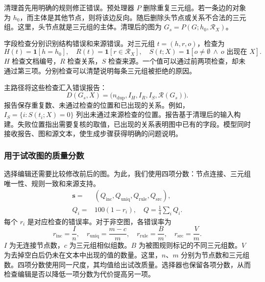 清理首先用明确的规则修正错误。预处理器 $P$ 删除重复三元组。若一条边的对象为 $h_0$，而主体是其他节点，则将该边反向。随后删除头节点或关系不合法的三元组。这里，头节点就是三元组的主体。清理后的图为 $G_s=P(G;h_0,\mathcal R_X)$。

字段检查分别识别结构错误和来源错误。对三元组 $t=(h,r,o)$，检查为
\begin{equation}
    \label{eq:diagnostic_predicates}
    H(t)=\mathbf1[h=h_0],\quad
    R(t)=\mathbf1[r\in\mathcal R_X],\quad
    S(t;X)=\mathbf1[o\ne\emptyset\ \wedge\ o\text{ 出现在 }X].
\end{equation}
$H$ 检查文档编号，$R$ 检查关系，$S$ 检查来源。一个值可以通过前两项检查，却未通过第三项。分别检查可以清楚说明每条三元组被拒绝的原因。

主路径将这些检查汇入错误报告：
\begin{equation}
    \label{eq:diagnostic_context}
    D(G_s,X)=\big(n_{\mathrm{dup}},I_H,I_R,I_S,\mathcal R(G_s)\big).
\end{equation}
报告保存重复数、未通过检查的位置和已出现的关系。例如，$I_S=\{i:S(t_i;X)=0\}$ 列出未通过来源检查的位置。报告基于清理后的输入构建。失败位置指出需要复核的取值，已出现的关系表明图中已有的字段。模型同时接收报告、图和源文本，使生成步骤获得明确的问题说明。

\subsubsection{用于试改图的质量分数}
\label{sec:impl:profile_revision}

选择编辑还需要比较修改前后的图。为此，我们使用四项分数：节点连接、三元组唯一性、规则一致和来源支持。
\begin{equation}
\label{eq:quality_state}
\begin{split}
\mathbf{s}={}&(Q_{\mathrm{inc}},Q_{\mathrm{uniq}},Q_{\mathrm{rule}},Q_{\mathrm{src}}),\\
Q_i={}&100(1-r_i),\quad Q=\tfrac14\sum_i Q_i.
\end{split}
\end{equation}
每个 $r_i$ 是对应检查的错误率。对于非空图，各错误率为
\begin{equation}
\label{eq:profile_rates}
r_{\mathrm{inc}}=\frac{I}{n},\quad
r_{\mathrm{uniq}}=\frac{m-c}{m},\quad
r_{\mathrm{rule}}=\frac{B}{m},\quad
r_{\mathrm{src}}=\frac{V}{m}.
\end{equation}
$I$ 为无连接节点数，$c$ 为三元组相似组数。$B$ 为被图规则标记的不同三元组数。$V$ 为去掉空白后仍未在文本中出现的值的数量。这里，$n$、$m$ 分别为节点数和三元组数。四项分数使用同一尺度，其均值给出试改质量。选择器也保留各项分数，从而检查编辑是否以降低一项分数为代价提高另一项。

